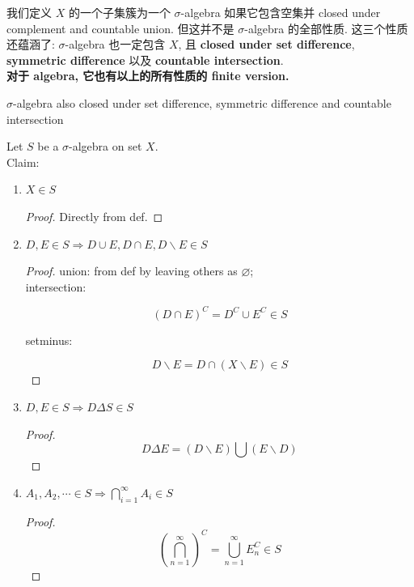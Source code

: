 \documentclass{qlnotes-export}
\begin{document}
我们定义 \(X\) 的一个子集簇为一个 \(\sigma\)-algebra 如果它包含空集并 closed under complement and countable union. 但这并不是 \(\sigma\)-algebra 的全部性质. 这三个性质还蕴涵了: \(\sigma\)-algebra 也一定包含 \(X\), 且 \textbf{closed under set difference}, \textbf{symmetric difference} 以及 \textbf{countable intersection}.\\
\textbf{对于 algebra, 它也有以上的所有性质的 finite version.}

\begin{theorem}{\(\sigma\)-algebra also closed under set difference, symmetric
difference and countable intersection}\label{thm-01-sigma-algebra-measure-sigma-algebra-also-closed-under-set-difference-symmetric-differe}

Let \(S\) be a \(\sigma\)-algebra on set \(X\).\\
Claim:

\begin{enumerate}
\item
  \(X \in S\)

  \begin{proof}

  Directly from def.

  \end{proof}
\item
  \(D,E \in S\Longrightarrow D \cup E,D \cap E,D\backslash E \in S\)

  \begin{proof}

  union: from def by leaving others as \(\varnothing\);\\
  intersection:

  \[(D \cap E)^{C} = D^{C} \cup E^{C} \in S\]

  setminus:

  \[D\backslash E = D \cap (X\backslash E) \in S\]

  \end{proof}
\item
  \(D,E \in S\Longrightarrow D\Delta S \in S\)

  \begin{proof}

  \[D\Delta E = (D\backslash E)\bigcup(E\backslash D)\]

  \end{proof}
\item
  \(A_{1},A_{2},\cdots \in S\Longrightarrow\bigcap_{i = 1}^{\infty}A_{i} \in S\)

  \begin{proof}

  \[(\bigcap\limits_{n = 1}^{\infty})^{C} = \bigcup\limits_{n = 1}^{\infty}E_{n}^{C} \in S\]

  \end{proof}
\end{enumerate}

\end{theorem}
\end{document}
